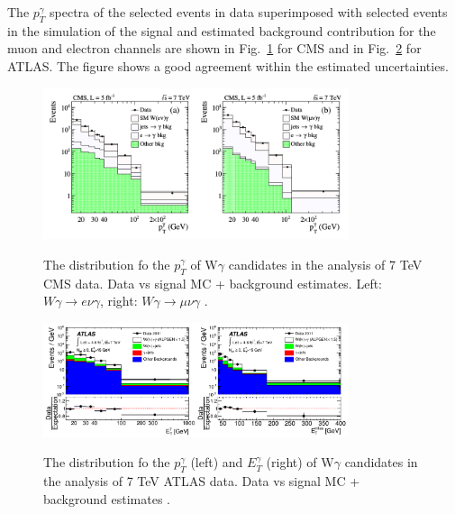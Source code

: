 
The $p_T^\gamma$ spectra of the selected events in data superimposed with selected events in the simulation of the signal and estimated background contribution for the muon and electron channels are shown in Fig.~\ref{fig:Wg7TeV_CMS_ptGamma} for CMS and in Fig.~\ref{fig:Wg7TeV_ATLAS_ptGamma} for ATLAS. The figure shows a good agreement within the estimated uncertainties.\\

\begin{figure}[htb]
  \begin{center}
    {\includegraphics[width=0.80\textwidth]{../figs/WgAbout/Wg7TeV_CMS_ptGamma.png}}
    \caption{The distribution fo the $p_T^\gamma$ of W$\gamma$ candidates in the analysis of 7 TeV CMS data. Data vs signal MC + background estimates. Left: $W\gamma\rightarrow e\nu\gamma$, right: $W\gamma\rightarrow \mu\nu\gamma$ \cite{ref_7TeV_CMS}.}
    \label{fig:Wg7TeV_CMS_ptGamma}
  \end{center}
\end{figure}

\begin{figure}[htb]
  \begin{center}
    {\includegraphics[width=0.80\textwidth]{../figs/WgAbout/Wg7TeV_ATLAS_ptGamma.png}}
    \caption{The distribution fo the $p_T^\gamma$ (left) and $E_T^\gamma$ (right) of W$\gamma$ candidates in the analysis of 7 TeV ATLAS data. Data vs signal MC + background estimates \cite{ref_7TeV_ATLAS}. }
    \label{fig:Wg7TeV_ATLAS_ptGamma}
  \end{center}
\end{figure}


